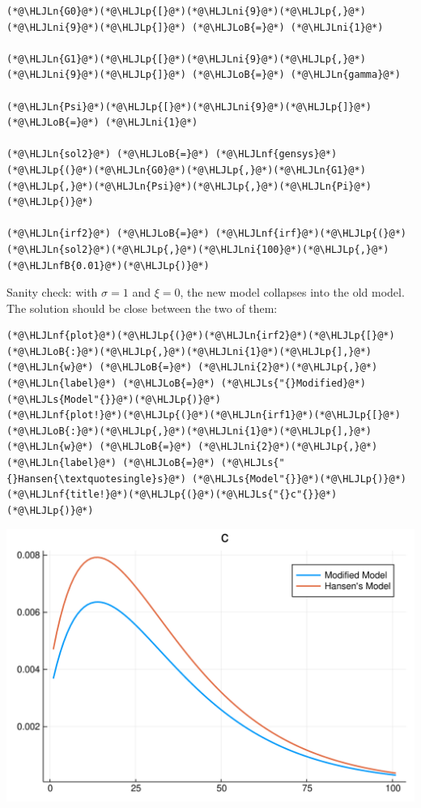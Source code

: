 \documentclass[12pt,a4paper]{article}
\newcommand{\HLJLn}[1]{#1}
\newcommand{\HLJLnf}[1]{\textcolor[RGB]{66,102,213}{#1}}
\newcommand{\HLJLs}[1]{\textcolor[RGB]{201,61,57}{#1}}
\newcommand{\HLJLnfB}[1]{\textcolor[RGB]{59,151,46}{#1}}
\newcommand{\HLJLni}[1]{\textcolor[RGB]{59,151,46}{#1}}
\newcommand{\HLJLoB}[1]{\textcolor[RGB]{102,102,102}{\textbf{#1}}}
\newcommand{\HLJLp}[1]{#1}
\begin{document}
\begin{lstlisting}
(*@\HLJLn{G0}@*)(*@\HLJLp{[}@*)(*@\HLJLni{9}@*)(*@\HLJLp{,}@*)(*@\HLJLni{9}@*)(*@\HLJLp{]}@*) (*@\HLJLoB{=}@*) (*@\HLJLni{1}@*)

(*@\HLJLn{G1}@*)(*@\HLJLp{[}@*)(*@\HLJLni{9}@*)(*@\HLJLp{,}@*)(*@\HLJLni{9}@*)(*@\HLJLp{]}@*) (*@\HLJLoB{=}@*) (*@\HLJLn{gamma}@*)

(*@\HLJLn{Psi}@*)(*@\HLJLp{[}@*)(*@\HLJLni{9}@*)(*@\HLJLp{]}@*) (*@\HLJLoB{=}@*) (*@\HLJLni{1}@*)

(*@\HLJLn{sol2}@*) (*@\HLJLoB{=}@*) (*@\HLJLnf{gensys}@*)(*@\HLJLp{(}@*)(*@\HLJLn{G0}@*)(*@\HLJLp{,}@*)(*@\HLJLn{G1}@*)(*@\HLJLp{,}@*)(*@\HLJLn{Psi}@*)(*@\HLJLp{,}@*)(*@\HLJLn{Pi}@*)(*@\HLJLp{)}@*)

(*@\HLJLn{irf2}@*) (*@\HLJLoB{=}@*) (*@\HLJLnf{irf}@*)(*@\HLJLp{(}@*)(*@\HLJLn{sol2}@*)(*@\HLJLp{,}@*)(*@\HLJLni{100}@*)(*@\HLJLp{,}@*)(*@\HLJLnfB{0.01}@*)(*@\HLJLp{)}@*)
\end{lstlisting}


Sanity check: with $\sigma=1$ and $\xi=0$, the new model collapses into the old model. The solution should be close between the two of them:


\begin{lstlisting}
(*@\HLJLnf{plot}@*)(*@\HLJLp{(}@*)(*@\HLJLn{irf2}@*)(*@\HLJLp{[}@*)(*@\HLJLoB{:}@*)(*@\HLJLp{,}@*)(*@\HLJLni{1}@*)(*@\HLJLp{],}@*) (*@\HLJLn{w}@*) (*@\HLJLoB{=}@*) (*@\HLJLni{2}@*)(*@\HLJLp{,}@*) (*@\HLJLn{label}@*) (*@\HLJLoB{=}@*) (*@\HLJLs{"{}Modified}@*) (*@\HLJLs{Model"{}}@*)(*@\HLJLp{)}@*)
(*@\HLJLnf{plot!}@*)(*@\HLJLp{(}@*)(*@\HLJLn{irf1}@*)(*@\HLJLp{[}@*)(*@\HLJLoB{:}@*)(*@\HLJLp{,}@*)(*@\HLJLni{1}@*)(*@\HLJLp{],}@*) (*@\HLJLn{w}@*) (*@\HLJLoB{=}@*) (*@\HLJLni{2}@*)(*@\HLJLp{,}@*) (*@\HLJLn{label}@*) (*@\HLJLoB{=}@*) (*@\HLJLs{"{}Hansen{\textquotesingle}s}@*) (*@\HLJLs{Model"{}}@*)(*@\HLJLp{)}@*)
(*@\HLJLnf{title!}@*)(*@\HLJLp{(}@*)(*@\HLJLs{"{}c"{}}@*)(*@\HLJLp{)}@*)
\end{lstlisting}

\includegraphics[width=\linewidth]{figures/yvan_5_1.pdf}
\end{document}
